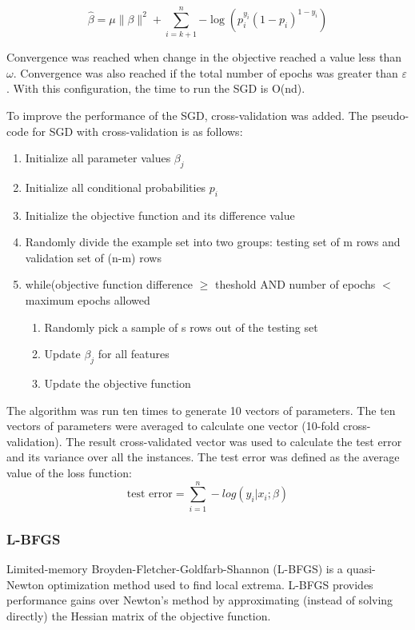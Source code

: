 \begin{equation}
    \widehat{\beta} = \mu \|\beta\|^2 + \sum_{i=k+1}^{n}{-\log(p_i^{y_i}(1 - p_i)^{1-y_i})}
\end{equation}

Convergence was reached when change in the objective reached a value less than $\omega$. Convergence was also reached if the total number of epochs was greater than $\varepsilon$. With this configuration, the time to run the SGD is O(nd).

To improve the performance of the SGD, cross-validation was added. The pseudo-code for SGD with cross-validation is as follows:
\begin{enumerate}
    \item Initialize all parameter values $\beta_j$
    \item Initialize all conditional probabilities $p_i$
    \item Initialize the objective function and its difference value
    \item Randomly divide the example set into two groups: testing set of m rows and validation set of (n-m) rows
    \item while(objective function difference $\geq$ theshold AND number of epochs $<$ maximum epochs allowed
    \begin{enumerate}
        \item Randomly pick a sample of s rows out of the testing set
        \item Update $\beta_j$ for all features
        \item Update the objective function
    \end{enumerate}
\end{enumerate}

The algorithm was run ten times to generate 10 vectors of parameters. The ten vectors of parameters were averaged to calculate one vector (10-fold cross-validation). The result cross-validated vector was used to calculate the test error and its variance over all the instances. The test error was defined as the average value of the loss function:
\begin{equation}
        \textrm{test error} = \sum_{i=1}^{n} -log(y_i | x_i ; \beta )
\end{equation}


\subsubsection{L-BFGS}
Limited-memory Broyden-Fletcher-Goldfarb-Shannon (L-BFGS) is a quasi-Newton optimization method used to find local extrema. L-BFGS provides performance gains over Newton's method by approximating (instead of solving directly) the Hessian matrix of the objective function.



